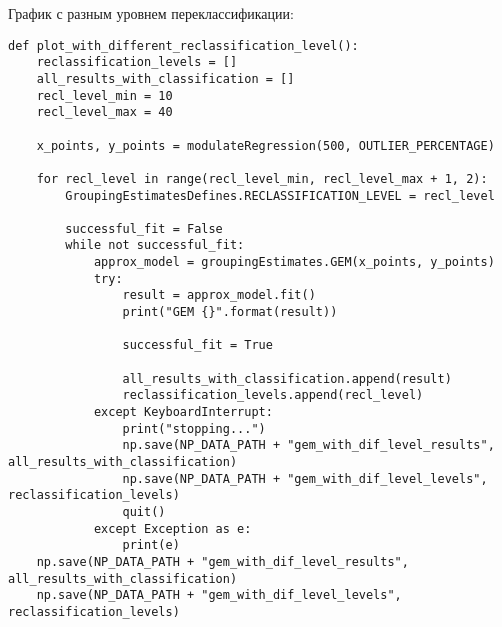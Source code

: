 График с разным уровнем переклассификации:
\begin{Verbatim}[fontsize=\scriptsize]
def plot_with_different_reclassification_level():
    reclassification_levels = []
    all_results_with_classification = []
    recl_level_min = 10
    recl_level_max = 40

    x_points, y_points = modulateRegression(500, OUTLIER_PERCENTAGE)

    for recl_level in range(recl_level_min, recl_level_max + 1, 2):
        GroupingEstimatesDefines.RECLASSIFICATION_LEVEL = recl_level

        successful_fit = False
        while not successful_fit:
            approx_model = groupingEstimates.GEM(x_points, y_points)
            try:
                result = approx_model.fit()
                print("GEM {}".format(result))

                successful_fit = True

                all_results_with_classification.append(result)
                reclassification_levels.append(recl_level)
            except KeyboardInterrupt:
                print("stopping...")
                np.save(NP_DATA_PATH + "gem_with_dif_level_results", all_results_with_classification)
                np.save(NP_DATA_PATH + "gem_with_dif_level_levels", reclassification_levels)
                quit()
            except Exception as e:
                print(e)
    np.save(NP_DATA_PATH + "gem_with_dif_level_results", all_results_with_classification)
    np.save(NP_DATA_PATH + "gem_with_dif_level_levels", reclassification_levels)

\end{Verbatim}